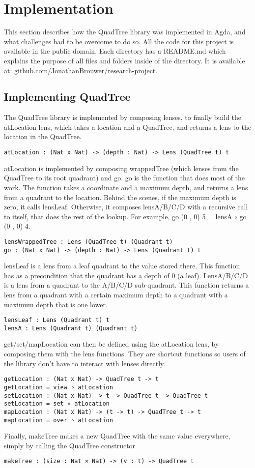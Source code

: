 \section{Implementation}
This section describes how the QuadTree library was implemented in Agda, and what challenges had to be overcome to do so. All the code for this project is available in the public domain. Each directory has a README.md which explains the purpose of all files and folders inside of the directory.
It is available at: \textcolor{blue}{\href{https://github.com/JonathanBrouwer/research-project}{github.com/JonathanBrouwer/research-project}}. 

\subsection{Implementing QuadTree}
The QuadTree library is implemented by composing lenses, to finally build the atLocation lens, which takes a location and a QuadTree, and returns a lens to the location in the QuadTree.
\begin{verbatim}
atLocation : (Nat x Nat) -> (depth : Nat) -> Lens (QuadTree t) t
\end{verbatim}
atLocation is implemented by composing wrappedTree (which lenses from the QuadTree to its root quadrant) and go. go is the function that does most of the work. The function takes a coordinate and a maximum depth, and returns a lens from a quadrant to the location. Behind the scenes, if the maximum depth is zero, it calls lensLeaf. Otherwise, it composes lensA/B/C/D with a recursive call to itself, that does the rest of the lookup. For example, go (0 , 0) 5 = lensA \(\circ\) go (0 , 0) 4. 
\begin{verbatim}
lensWrappedTree : Lens (QuadTree t) (Quadrant t)
go : (Nat x Nat) -> (depth : Nat) -> Lens (Quadrant t) t
\end{verbatim}
lensLeaf is a lens from a leaf quadrant to the value stored there. This function has as a precondition that the quadrant has a depth of 0 (a leaf). LensA/B/C/D is a lens from a quadrant to the A/B/C/D sub-quadrant. This function returns a lens from a quadrant with a certain maximum depth to a quadrant with a maximum depth that is one lower. 
\begin{verbatim}
lensLeaf : Lens (Quadrant t) t
lensA : Lens (Quadrant t) (Quadrant t)
\end{verbatim}
get/set/mapLocation can then be defined using the atLocation lens, by composing them with the lens functions. They are shortcut functions so users of the library don't have to interact with lenses directly.
\begin{verbatim}
getLocation : (Nat x Nat) -> QuadTree t -> t
getLocation = view ∘ atLocation
setLocation : (Nat x Nat) -> t -> QuadTree t -> QuadTree t
setLocation = set ∘ atLocation
mapLocation : (Nat x Nat) -> (t -> t) -> QuadTree t -> t
mapLocation = over ∘ atLocation
\end{verbatim}
Finally, makeTree makes a new QuadTree with the same value everywhere, simply by calling the QuadTree constructor
\begin{verbatim}
makeTree : (size : Nat × Nat) -> (v : t) -> QuadTree t
\end{verbatim}

